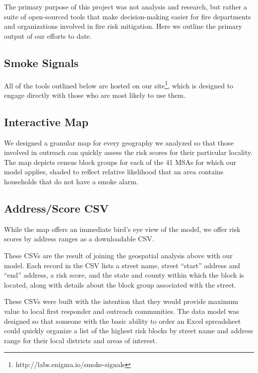 \documentclass{sig-alternate}
\begin{document}
The primary purpose of this project was not analysis and research, but rather a suite of open-sourced tools that make decision-making easier for fire departments and organizations involved in fire risk mitigation. Here we outline the primary output of our efforts to date.

\subsection{Smoke Signals}

All of the tools outlined below are hosted on our site\footnote{http://labs.enigma.io/smoke-signals}, which is designed to engage directly with those who are most likely to use them. 

\subsection{Interactive Map}

We designed a granular map for every geography we analyzed so that those involved in outreach can quickly assess the risk scores for their particular locality. The map depicts census block groups for each of the 41 MSAs for which our model applies, shaded to reflect relative likelihood that an area contains households that do not have a smoke alarm.

\subsection{Address/Score CSV}

While the map offers an immediate bird's eye view of the model, we offer risk scores by address ranges as a downloadable CSV.

These CSVs are the result of joining the geospatial analysis above with our model. Each record in the CSV lists a street name, street ``start'' address and ``end'' address, a risk score, and the state and county within which the block is located, along with details about the block group associated with the street.

These CSVs were built with the intention that they would provide maximum value to local first responder and outreach communities. The data model was designed so that someone with the basic ability to order an Excel spreadsheet could quickly organize a list of the highest risk blocks by street name and address range for their local districts and areas of interest.
\end{document}
